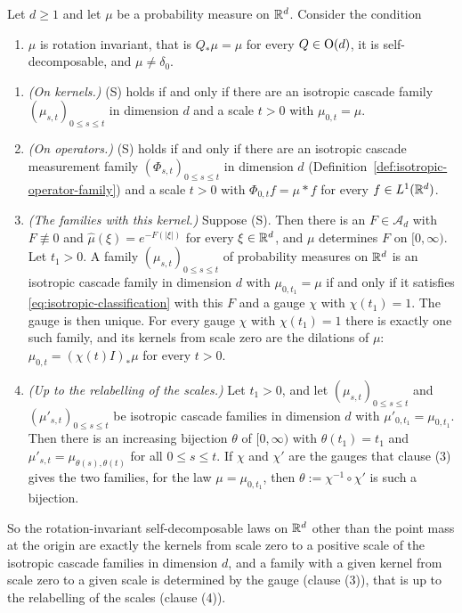 \begin{corollary}\label{cor:isotropic-scale-zero-kernels}
Let $d \ge 1$ and let $\mu$ be a probability measure on $\mathbb{R}^d$. Consider the condition
\begin{enumerate}
\item[(S)] $\mu$ is rotation invariant, that is $Q_*\mu = \mu$ for every $Q \in \mathrm{O}(d)$, it is
self-decomposable, and $\mu \ne \delta_0$.
\end{enumerate}
\begin{enumerate}
\item \emph{(On kernels.)} (S) holds if and only if there are an isotropic cascade family
$(\mu_{s,t})_{0 \le s \le t}$ in dimension $d$ and a scale $t > 0$ with $\mu_{0,t} = \mu$.
\item \emph{(On operators.)} (S) holds if and only if there are an isotropic cascade measurement
family $(\Phi_{s,t})_{0 \le s \le t}$ in dimension $d$ (Definition~\ref{def:isotropic-operator-family}) and
a scale $t > 0$ with $\Phi_{0,t}f = \mu * f$ for every $f \in L^1(\mathbb{R}^d)$.
\item \emph{(The families with this kernel.)} Suppose (S). Then there is an $F \in \mathcal{A}_d$
with $F \not\equiv 0$ and $\widehat\mu(\xi) = e^{-F(|\xi|)}$ for every $\xi \in \mathbb{R}^d$, and $\mu$
determines $F$ on $[0,\infty)$. Let $t_1 > 0$. A family $(\mu_{s,t})_{0 \le s \le t}$ of
probability measures on $\mathbb{R}^d$ is an isotropic cascade family in dimension $d$ with
$\mu_{0,t_1} = \mu$ if and only if it satisfies \ref{eq:isotropic-classification} with this $F$
and a gauge $\chi$ with $\chi(t_1) = 1$. The gauge is then unique. For every gauge $\chi$ with
$\chi(t_1) = 1$ there is exactly one such family, and its kernels from scale zero are the
dilations of $\mu$: $\mu_{0,t} = (\chi(t)I)_*\mu$ for every $t > 0$.
\item \emph{(Up to the relabelling of the scales.)} Let $t_1 > 0$, and let
$(\mu_{s,t})_{0 \le s \le t}$ and $(\mu'_{s,t})_{0 \le s \le t}$ be isotropic cascade families
in dimension $d$ with $\mu'_{0,t_1} = \mu_{0,t_1}$. Then there is an increasing bijection
$\theta$ of $[0,\infty)$ with $\theta(t_1) = t_1$ and
$\mu'_{s,t} = \mu_{\theta(s),\theta(t)}$ for all $0 \le s \le t$. If $\chi$ and $\chi'$ are the
gauges that clause (3) gives the two families, for the law $\mu = \mu_{0,t_1}$, then
$\theta := \chi^{-1} \circ \chi'$ is such a bijection.
\end{enumerate}
So the rotation-invariant self-decomposable laws on $\mathbb{R}^d$ other than the point mass at the
origin are exactly the kernels from scale zero to a positive scale of the isotropic cascade
families in dimension $d$, and a family with a given kernel from scale zero to a given scale is
determined by the gauge (clause (3)), that is up to the relabelling of the scales (clause (4)).
\end{corollary}

